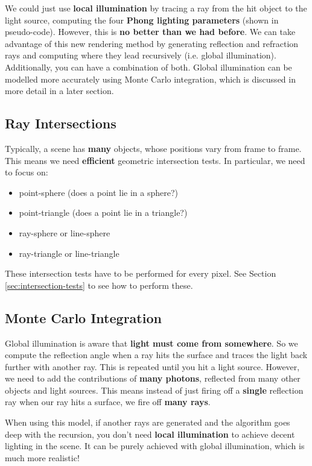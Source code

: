 \documentclass{article}
\begin{document}
We could just use \textbf{local illumination} by tracing a ray from the hit object to the light source, computing the four \textbf{Phong lighting parameters} (shown in pseudo-code). However, this is \textbf{no better than we had before}. We can take advantage of this new rendering method by generating reflection and refraction rays and computing where they lead recursively (i.e. global illumination). Additionally, you can have a combination of both. Global illumination can be modelled more accurately using Monte Carlo integration, which is discussed in more detail in a later section.

\subsection{Ray Intersections}

Typically, a scene has \textbf{many} objects, whose positions vary from frame to frame. This means we need \textbf{efficient} geometric intersection tests. In particular, we need to focus on:
\begin{itemize}
	\item point-sphere (does a point lie in a sphere?)
	\item point-triangle (does a point lie in a triangle?)
	\item ray-sphere or line-sphere
	\item ray-triangle or line-triangle
\end{itemize}
These intersection tests have to be performed for every pixel. See Section \ref{sec:intersection-tests} to see how to perform these.

\subsection{Monte Carlo Integration}

Global illumination is aware that \textbf{light must come from somewhere}. So we compute the reflection angle when a ray hits the surface and traces the light back further with another ray. This is repeated until you hit a light source. However, we need to add the contributions of \textbf{many photons}, reflected from many other objects and light sources. This means instead of just firing off a \textbf{single} reflection ray when our ray hits a surface, we fire off \textbf{many rays}.

When using this model, if another rays are generated and the algorithm goes deep with the recursion, you don't need \textbf{local illumination} to achieve decent lighting in the scene. It can be purely achieved with global illumination, which is much more realistic!
\end{document}
